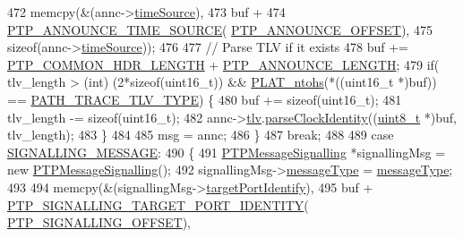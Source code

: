 \begin{DoxyCode}
{{{{{{{{472             memcpy(&(annc->\hyperlink{class_p_t_p_message_announce_a56fd97f48cb931b2450032650f82ef17}{timeSource}),
473                    buf +
474                    \hyperlink{avbts__message_8hpp_ac69e2a9341554bbbf10612cd50b5f181}{PTP\_ANNOUNCE\_TIME\_SOURCE}(
      \hyperlink{avbts__message_8hpp_aaa3da4fa4e9e4cfe49477cd7f6b95bca}{PTP\_ANNOUNCE\_OFFSET}),
475                    \textcolor{keyword}{sizeof}(annc->\hyperlink{class_p_t_p_message_announce_a56fd97f48cb931b2450032650f82ef17}{timeSource}));
476 
477             \textcolor{comment}{// Parse TLV if it exists}
478             buf += \hyperlink{avbts__message_8hpp_a8ec4d965b7b1e83844f1c17f12e9b8e4}{PTP\_COMMON\_HDR\_LENGTH} + 
      \hyperlink{avbts__message_8hpp_ad800b5cd5359d021054af8e902100ba7}{PTP\_ANNOUNCE\_LENGTH};
479             \textcolor{keywordflow}{if}( tlv\_length > (\textcolor{keywordtype}{int}) (2*\textcolor{keyword}{sizeof}(uint16\_t)) && \hyperlink{linux_2src_2platform_8cpp_a6b8f3e7b87b66fa774a07ddc67f883a7}{PLAT\_ntohs}(*((uint16\_t *)buf)) == 
      \hyperlink{avbts__message_8hpp_a10ec0e6a0943853c9deaf56616dbebf7}{PATH\_TRACE\_TLV\_TYPE})  \{
480                 buf += \textcolor{keyword}{sizeof}(uint16\_t);
481                 tlv\_length -= \textcolor{keyword}{sizeof}(uint16\_t);
482                 annc->\hyperlink{class_p_t_p_message_announce_ac7b185260086ad357ff7a9c29f468936}{tlv}.\hyperlink{class_path_trace_t_l_v_a66b71b1178893f98ba403e961e8fb6cf}{parseClockIdentity}((\hyperlink{stdint_8h_aba7bc1797add20fe3efdf37ced1182c5}{uint8\_t} *)buf, tlv\_length);
483             \}
484 
485             msg = annc;
486         \}
487         \textcolor{keywordflow}{break};
488 
489     \textcolor{keywordflow}{case} \hyperlink{avbts__message_8hpp_ac6606ebe91c8ac66a2c314c79f5ab013a126e822073ff23ccb061021926a152a3}{SIGNALLING\_MESSAGE}:
490         \{
491             \hyperlink{class_p_t_p_message_signalling}{PTPMessageSignalling} *signallingMsg = \textcolor{keyword}{new} 
      \hyperlink{class_p_t_p_message_signalling_aa92187590c176d35d5deecc9e763b777}{PTPMessageSignalling}();
492             signallingMsg->\hyperlink{class_p_t_p_message_common_adb32627aa5b0e2dbad3ccd88aab07c05}{messageType} = \hyperlink{class_p_t_p_message_common_adb32627aa5b0e2dbad3ccd88aab07c05}{messageType};
493 
494             memcpy(&(signallingMsg->\hyperlink{class_p_t_p_message_signalling_a1d4353212906ed7366ffbf01cb56bdab}{targetPortIdentify}),
495                    buf + \hyperlink{avbts__message_8hpp_a068292a37a4f0716f4b6ba81222fb9a5}{PTP\_SIGNALLING\_TARGET\_PORT\_IDENTITY}(
      \hyperlink{avbts__message_8hpp_a3528ebe88df8c782038079cb1165d540}{PTP\_SIGNALLING\_OFFSET}),
}}}}}}}}
\end{DoxyCode}
